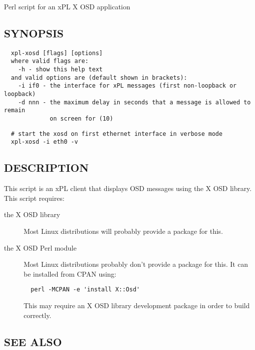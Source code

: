 Perl script for an xPL X OSD application

\subsection*{SYNOPSIS\label{xpl-xosd_SYNOPSIS}}
\begin{verbatim}
  xpl-xosd [flags] [options]
  where valid flags are:
    -h - show this help text
  and valid options are (default shown in brackets):
    -i if0 - the interface for xPL messages (first non-loopback or loopback)
    -d nnn - the maximum delay in seconds that a message is allowed to remain
             on screen for (10)
\end{verbatim}
\begin{verbatim}
  # start the xosd on first ethernet interface in verbose mode
  xpl-xosd -i eth0 -v
\end{verbatim}
\subsection*{DESCRIPTION\label{xpl-xosd_DESCRIPTION}}


This script is an xPL client that displays OSD messages using the X OSD
library.  This script requires:

\begin{description}

\item[{the X OSD library}] \mbox{}

Most Linux distributions will probably provide a package for this.


\item[{the X OSD Perl module}] \mbox{}

Most Linux distributions probably don't provide a package for this.  It
can be installed from CPAN using:

\begin{verbatim}
  perl -MCPAN -e 'install X::Osd'
\end{verbatim}


This may require an X OSD library development package in order to build
correctly.

\end{description}
\subsection*{SEE ALSO\label{xpl-xosd_SEE_ALSO}}


